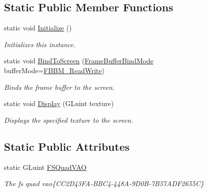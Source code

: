 \subsection*{Static Public Member Functions}
\begin{DoxyCompactItemize}
\item 
static void \hyperlink{class_frame_buffer_af1d4cb768692b76c354f24a6e98d5419}{Initialize} ()
\begin{DoxyCompactList}\small\item\em Initializes this instance. \end{DoxyCompactList}\item 
static void \hyperlink{class_frame_buffer_a9d0fd2932ec6db8f14a57ad1d97b4e45}{Bind\+To\+Screen} (\hyperlink{_frame_buffer_8h_a3318e72469ce5bc8393bd02d39bc3742}{Frame\+Buffer\+Bind\+Mode} buffer\+Mode=\hyperlink{_frame_buffer_8h_a3318e72469ce5bc8393bd02d39bc3742ae77f3997d632fbdbe50556a908b53be1}{F\+B\+B\+M\+\_\+\+Read\+Write})
\begin{DoxyCompactList}\small\item\em Binds the frame buffer to the screen. \end{DoxyCompactList}\item 
static void \hyperlink{class_frame_buffer_aa71789f57e31a8f54f8ff2e9067afdb2}{Display} (G\+Luint texture)
\begin{DoxyCompactList}\small\item\em Displays the specified texture to the screen. \end{DoxyCompactList}\end{DoxyCompactItemize}
\subsection*{Static Public Attributes}
\begin{DoxyCompactItemize}
\item 
static G\+Luint \hyperlink{class_frame_buffer_a22b0c9de2bef06e0de865684556a6677}{F\+S\+Quad\+V\+AO}
\begin{DoxyCompactList}\small\item\em The fs quad vao\{C\+C2\+D43\+F\+A-\/\+B\+B\+C4-\/448\+A-\/9\+D0\+B-\/7\+B57\+A\+D\+F2655C\} \end{DoxyCompactList}\end{DoxyCompactItemize}
